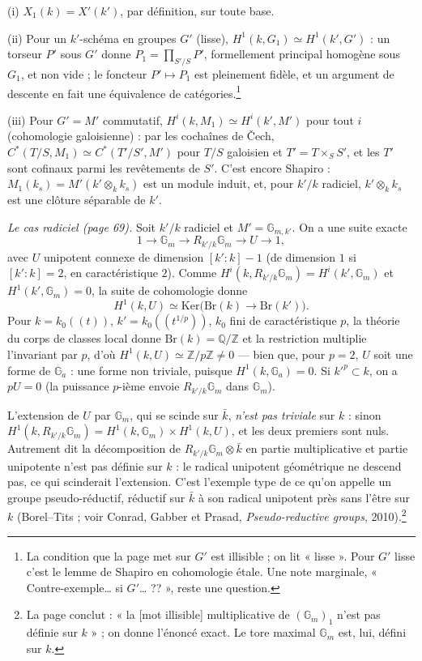 \documentclass[11pt,a4paper]{article}
\begin{document}
(i) $X_1(k) = X'(k')$, par définition, sur toute base.

(ii) Pour un $k'$-schéma en groupes $G'$ (lisse), $H^1(k, G_1) \simeq H^1(k',
G')$ : un torseur $P'$ sous $G'$ donne $P_1 = \prod_{S'/S} P'$, formellement
principal homogène sous $G_1$, et non vide ; le foncteur $P' \mapsto P_1$ est
pleinement fidèle, et un argument de descente en fait une équivalence de
catégories.\footnote{La condition que la page met sur $G'$ est illisible ; on
lit « lisse ». Pour $G'$ lisse c'est le lemme de Shapiro en cohomologie
étale. Une note marginale, « Contre-exemple… si $G'$… ?? », reste une
question.}

(iii) Pour $G' = M'$ commutatif, $H^{i}(k, M_1) \simeq H^{i}(k', M')$ pour tout
$i$ (cohomologie galoisienne) : par les cochaînes de Čech, $C^{*}(T/S, M_1)
\simeq C^{*}(T'/S', M')$ pour $T/S$ galoisien et $T' = T \times_S S'$, et les
$T'$ sont cofinaux parmi les revêtements de $S'$. C'est encore Shapiro : $M_1(k_s)
= M'(k' \otimes_k k_s)$ est un module induit, et, pour $k'/k$ radiciel, $k'
\otimes_k k_s$ est une clôture séparable de $k'$.

\emph{Le cas radiciel (page 69).} Soit $k'/k$ radiciel et $M' =
\mathbb{G}_{m,k'}$. On a une suite exacte
\[
1 \to \mathbb{G}_m \to R_{k'/k}\mathbb{G}_m \to U \to 1,
\]
avec $U$ unipotent connexe de dimension $[k':k] - 1$ (de dimension $1$ si
$[k':k] = 2$, en caractéristique $2$). Comme $H^{i}(k, R_{k'/k}\mathbb{G}_m) =
H^{i}(k', \mathbb{G}_m)$ et $H^1(k', \mathbb{G}_m) = 0$, la suite de cohomologie
donne
\[
H^1(k, U) \simeq \mathrm{Ker}\bigl(\mathrm{Br}(k) \to \mathrm{Br}(k')\bigr).
\]
Pour $k = k_0((t))$, $k' = k_0((t^{1/p}))$, $k_0$ fini de caractéristique $p$,
la théorie du corps de classes local donne $\mathrm{Br}(k) = \mathbb{Q}/\mathbb{Z}$
et la restriction multiplie l'invariant par $p$, d'où $H^1(k, U) \simeq
\mathbb{Z}/p\mathbb{Z} \neq 0$ — bien que, pour $p = 2$, $U$ soit une forme de
$\mathbb{G}_a$ : une forme non triviale, puisque $H^1(k, \mathbb{G}_a) = 0$. Si
$k'^{p} \subset k$, on a $pU = 0$ (la puissance $p$-ième envoie
$R_{k'/k}\mathbb{G}_m$ dans $\mathbb{G}_m$).

L'extension de $U$ par $\mathbb{G}_m$, qui se scinde sur $\bar{k}$, \emph{n'est
pas triviale} sur $k$ : sinon $H^1(k, R_{k'/k}\mathbb{G}_m) = H^1(k,
\mathbb{G}_m) \times H^1(k, U)$, et les deux premiers sont nuls. Autrement dit
la décomposition de $R_{k'/k}\mathbb{G}_m \otimes \bar{k}$ en partie
multiplicative et partie unipotente n'est pas définie sur $k$ : le radical
unipotent géométrique ne descend pas, ce qui scinderait l'extension. C'est
l'exemple type de ce qu'on appelle un groupe pseudo-réductif, réductif sur
$\bar{k}$ à son radical unipotent près sans l'être sur $k$ (Borel–Tits ; voir
Conrad, Gabber et Prasad, \emph{Pseudo-reductive groups}, 2010).\footnote{La
page conclut : « la [mot illisible] multiplicative de $(\mathbb{G}_m)_1$ n'est
pas définie sur $k$ » ; on donne l'énoncé exact. Le tore maximal $\mathbb{G}_m$
est, lui, défini sur $k$.}
\end{document}
